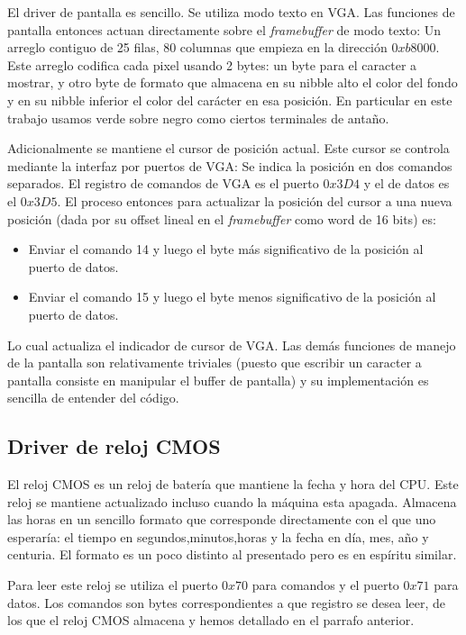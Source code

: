 El driver de pantalla es sencillo. Se utiliza modo texto en VGA. Las funciones de pantalla entonces actuan directamente
sobre el \textit{framebuffer} de modo texto: Un arreglo contiguo de 25 filas, 80 columnas que empieza en la direcci\'on
$0xb8000$. Este arreglo codifica cada pixel usando 2 bytes: un byte para el caracter a mostrar, y otro byte de formato que almacena 
en su nibble alto el color del fondo y en su nibble inferior el color del car\'acter en esa posici\'on. 
En particular en este trabajo usamos verde sobre negro como ciertos terminales de anta\~no.

Adicionalmente se mantiene el cursor de posici\'on actual. Este cursor se controla mediante la interfaz por puertos de VGA:
Se indica la posici\'on en dos comandos separados. El registro de comandos de VGA es el puerto $0x3D4$ y el de datos es el
$0x3D5$. El proceso entonces para actualizar la posici\'on del cursor a una nueva posici\'on (dada por su offset lineal en
el \textit{framebuffer} como word de 16 bits) es:

\begin{itemize}
	\item Enviar el comando 14 y luego el byte m\'as significativo de la posici\'on al puerto de datos.
	\item Enviar el comando 15 y luego el byte menos significativo de la posici\'on al puerto de datos.
\end{itemize}

Lo cual actualiza el indicador de cursor de VGA. Las dem\'as funciones de manejo de la pantalla son relativamente triviales
(puesto que escribir un caracter a pantalla consiste en manipular el buffer de pantalla) y su implementaci\'on es sencilla de
entender del c\'odigo.

\subsection{Driver de reloj CMOS}

El reloj CMOS es un reloj de bater\'ia que mantiene la fecha y hora del CPU. Este reloj se mantiene actualizado incluso cuando
la m\'aquina esta apagada. Almacena las horas en un sencillo formato que corresponde directamente con el que uno esperar\'ia: el
tiempo en segundos,minutos,horas y la fecha en d\'ia, mes, a\~no y centuria. El formato es un poco distinto al presentado pero es
en esp\'iritu similar.

Para leer este reloj se utiliza el puerto $0x70$ para comandos y el puerto $0x71$ para datos. Los comandos son bytes correspondientes
a que registro se desea leer, de los que el reloj CMOS almacena y hemos detallado en el parrafo anterior.

